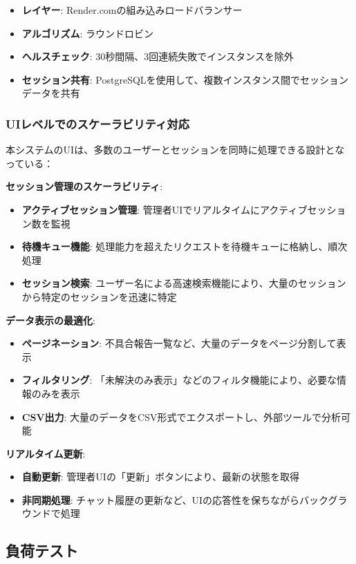 \documentclass[a4paper,11pt,ja=standard,xelatex]{bxjsarticle}
\theoremstyle{definition}
\begin{document}
\begin{itemize}
\item \textbf{レイヤー}: Render.comの組み込みロードバランサー
\item \textbf{アルゴリズム}: ラウンドロビン
\item \textbf{ヘルスチェック}: 30秒間隔、3回連続失敗でインスタンスを除外
\item \textbf{セッション共有}: PostgreSQLを使用して、複数インスタンス間でセッションデータを共有
\end{itemize}

\subsubsection{UIレベルでのスケーラビリティ対応}

本システムのUIは、多数のユーザーとセッションを同時に処理できる設計となっている：

\textbf{セッション管理のスケーラビリティ}:
\begin{itemize}
\item \textbf{アクティブセッション管理}: 管理者UIでリアルタイムにアクティブセッション数を監視
\item \textbf{待機キュー機能}: 処理能力を超えたリクエストを待機キューに格納し、順次処理
\item \textbf{セッション検索}: ユーザー名による高速検索機能により、大量のセッションから特定のセッションを迅速に特定
\end{itemize}

\textbf{データ表示の最適化}:
\begin{itemize}
\item \textbf{ページネーション}: 不具合報告一覧など、大量のデータをページ分割して表示
\item \textbf{フィルタリング}: 「未解決のみ表示」などのフィルタ機能により、必要な情報のみを表示
\item \textbf{CSV出力}: 大量のデータをCSV形式でエクスポートし、外部ツールで分析可能
\end{itemize}

\textbf{リアルタイム更新}:
\begin{itemize}
\item \textbf{自動更新}: 管理者UIの「更新」ボタンにより、最新の状態を取得
\item \textbf{非同期処理}: チャット履歴の更新など、UIの応答性を保ちながらバックグラウンドで処理
\end{itemize}

\subsection{負荷テスト}
\end{document}
